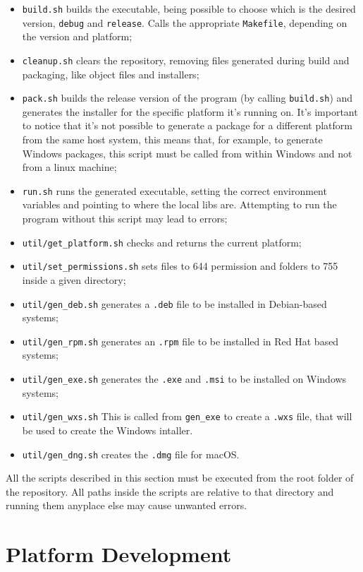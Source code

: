 \begin{itemize}
	\item \texttt{build.sh} builds the executable, being possible to choose which is the desired version, \texttt{debug} and \texttt{release}. Calls the appropriate \texttt{Makefile}, depending on the version and platform;
	\item \texttt{cleanup.sh} clears the repository, removing files generated during build and packaging, like object files and installers;
	\item \texttt{pack.sh} builds the release version of the program (by calling \texttt{build.sh}) and generates the installer for the specific platform it's running on. It's important to notice that it's not possible to generate a package for a different platform from the same host system, this means that, for example, to generate Windows packages, this script must be called from within Windows and not from a linux machine;
	\item \texttt{run.sh} runs the generated executable, setting the correct environment variables and pointing to where the local libs are. Attempting to run the program without this script may lead to errors;
	\item \texttt{util/get\_platform.sh} checks and returns the current platform;
	\item \texttt{util/set\_permissions.sh} sets files to 644 permission and folders to 755 inside a given directory;
	\item \texttt{util/gen\_deb.sh} generates a \texttt{.deb} file to be installed in Debian-based systems;
	\item \texttt{util/gen\_rpm.sh} generates an \texttt{.rpm} file to be installed in Red Hat based systems;
	\item \texttt{util/gen\_exe.sh} generates the \texttt{.exe} and \texttt{.msi} to be installed on Windows systems;
	\item \texttt{util/gen\_wxs.sh} This is called from \texttt{gen\_exe} to create a \texttt{.wxs} file, that will be used to create the Windows intaller.
	\item \texttt{util/gen\_dng.sh} creates the \texttt{.dmg} file for macOS.
\end{itemize}


All the scripts described in this section must be executed from the root folder of the repository. All paths inside the scripts are relative to that directory and running them anyplace else may cause unwanted errors.


\section{Platform Development}
\label{sec:platform_development}

